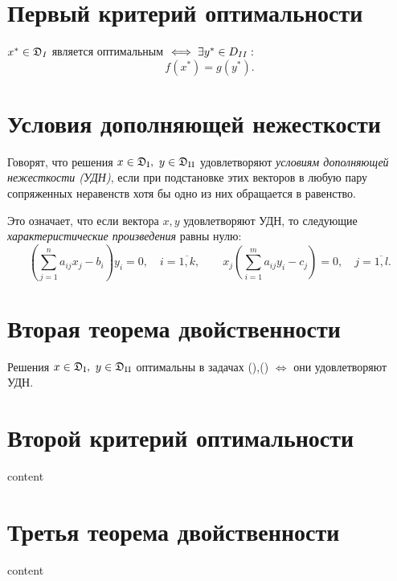 \section{Первый критерий оптимальности}

\begin{corollary}
	$x^* \in \mathfrak{D}_\RomanNumeralCaps{1}$ является оптимальным $\iff \exists y^* \in D_{\RomanNumeralCaps{2}}:$
	\[
		f(x^*) = g(y^*).
	\]
\end{corollary}

\section{Условия дополняющей нежесткости}

\begin{definition}
	Говорят, что решения $ x \in \mathfrak{D}_\text{\RomanNumeralCaps{1}}, \ y \in \mathfrak{D}_\text{\RomanNumeralCaps{2}} $ удовлетворяют \emph{условиям дополняющей нежесткости (УДН)}, если при подстановке этих векторов в любую пару сопряженных неравенств хотя бы одно из них обращается в равенство.

	Это означает, что если вектора $ x,y $ удовлетворяют УДН, то следующие \emph{характеристические произведения} равны нулю:
	\[
		\left(\sum_{j=1}^{n}a_{ij}x_j - b_i\right)y_i = 0, \quad i = \overline{1,k}, \qquad x_j \left(\sum_{i=1}^{m}a_{ij}y_i - c_j\right) = 0, \quad j = \overline{1,l}.
	\]
\end{definition}

\section{Вторая теорема двойственности}

\begin{theorem}
	Решения $ x \in \mathfrak{D}_\text{\RomanNumeralCaps{1}}, \ y \in \mathfrak{D}_\text{\RomanNumeralCaps{2}} $ оптимальны в задачах (),() $ \iff $ они удовлетворяют УДН.
\end{theorem}

\section{Второй критерий оптимальности}

content

\section{Третья теорема двойственности}

content
